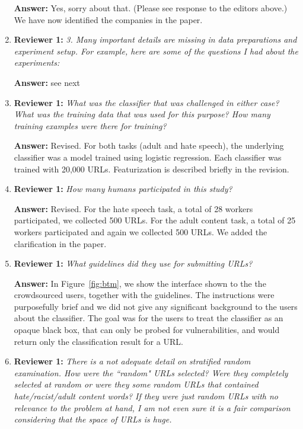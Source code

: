 \documentclass[letterpaper]{article}
\begin{document}
\begin{enumerate}
\textbf{Answer:}  Yes, sorry about that. (Please see response to the editors above.) We have now identified the companies in the paper.

\item \textbf{Reviewer 1:} \emph{3. Many important details are missing in data preparations and experiment setup. For example, here are some of the questions I had about the experiments:}

\textbf{Answer:} see next

\item \textbf{Reviewer 1:} \emph{What was the classifier that was challenged in either case? What was the training data that was used for this purpose? How many training examples were there for training?}

\textbf{Answer:} Revised. For both tasks (adult and hate speech), the underlying classifier was a model trained using logistic regression. Each classifier was trained with 20,000 URLs. Featurization is described briefly in the revision.

\item \textbf{Reviewer 1:} \emph{How many humans participated in this study?}

\textbf{Answer:} Revised. For the hate speech task, a total of 28 workers participated, we collected 500 URLs. For the adult content task, a total of 25 workers participated and again we collected 500 URLs. We added the clarification in the paper.

\item \textbf{Reviewer 1:} \emph{What guidelines did they use for submitting URLs?}

\textbf{Answer:} In Figure~\ref{fig:btm}, we show the interface shown to the the crowdsourced users, together with the guidelines. The instructions were purposefully brief and we did not give any significant background to the users about the classifier. The goal was for the users to treat the classifier as an opaque black box, that can only be probed for vulnerabilities, and would return only the classification result for a URL.

\item \textbf{Reviewer 1:} \emph{ There is a not adequate detail on stratified random examination. How were the ``random" URLs selected?  Were they completely selected at random or were they some random URLs that contained hate/racist/adult content words? If they were just random URLs with no relevance to the problem at hand, I am not even sure it is a fair comparison considering that the space of URLs is huge.}


\end{enumerate}
\end{document}
